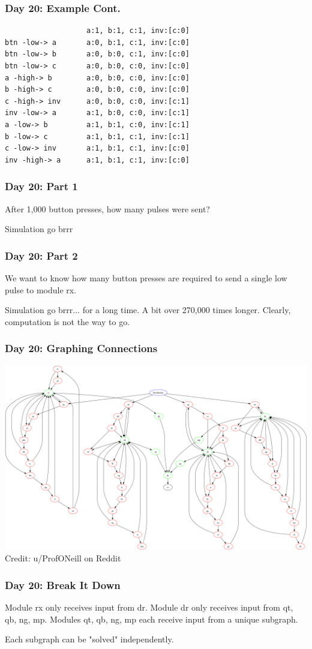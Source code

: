 \begin{frame}[fragile]
\frametitle{Day 20: Example Cont.}

\begin{center}
\begin{verbatim}
                   a:1, b:1, c:1, inv:[c:0]
btn -low-> a       a:0, b:1, c:1, inv:[c:0]
btn -low-> b       a:0, b:0, c:1, inv:[c:0]
btn -low-> c       a:0, b:0, c:0, inv:[c:0]
a -high-> b        a:0, b:0, c:0, inv:[c:0]
b -high-> c        a:0, b:0, c:0, inv:[c:0]
c -high-> inv      a:0, b:0, c:0, inv:[c:1]
inv -low-> a       a:1, b:0, c:0, inv:[c:1]
a -low-> b         a:1, b:1, c:0, inv:[c:1]
b -low-> c         a:1, b:1, c:1, inv:[c:1]
c -low-> inv       a:1, b:1, c:1, inv:[c:0]
inv -high-> a      a:1, b:1, c:1, inv:[c:0]
\end{verbatim}
\end{center}

\end{frame}

\begin{frame}
\frametitle{Day 20: Part 1}

After 1,000 button presses, how many pulses were sent?\vfill

Simulation go brrr

\end{frame}

\begin{frame}
\frametitle{Day 20: Part 2}

We want to know how many button presses are required to send a single low pulse to module rx.\vfill

Simulation go brrr... for a long time. A bit over 270,000 times longer. Clearly, computation is not the way to go.\vfill

\end{frame}

\begin{frame}
\frametitle{Day 20: Graphing Connections}

\includegraphics[width=\textwidth]{Day20ModuleGraph}
Credit: u/ProfONeill on Reddit

\end{frame}

\begin{frame}
\frametitle{Day 20: Break It Down}

Module rx only receives input from dr.\linebreak
Module dr only receives input from qt, qb, ng, mp.\linebreak
Modules qt, qb, ng, mp each receive input from a unique subgraph.\vfill

Each subgraph can be "solved" independently.

\end{frame}